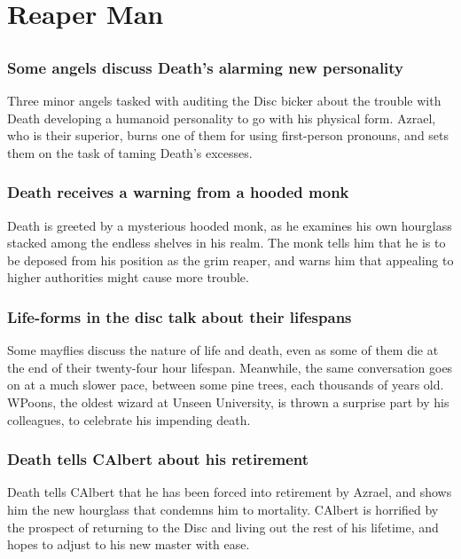 \section{Reaper Man}


\subsection{}
\subsubsection{Some angels discuss \Gls{Death}'s alarming new personality}
Three minor angels tasked with auditing the Disc bicker about the trouble with \Gls{Death}
developing a humanoid personality to go with his physical form. \Gls{Azrael}, who is their superior,
burns one of them for using first-person pronouns, and sets them on the task of taming \Gls{Death}'s
excesses.

\subsubsection{\Gls{Death} receives a warning from a hooded monk}
\Gls{Death} is greeted by a mysterious hooded monk, as he examines his own hourglass stacked among
the endless shelves in his realm. The monk tells him that he is to be deposed from his position as
the grim reaper, and warns him that appealing to higher authorities might cause more trouble.

\subsubsection{Life-forms in the disc talk about their lifespans}
Some mayflies discuss the nature of life and death, even as some of them die at the end of their
twenty-four hour lifespan. Meanwhile, the same conversation goes on at a much slower pace, between
some pine trees, each thousands of years old. \Gls{WPoons}, the oldest wizard at Unseen University,
is thrown a surprise part by his colleagues, to celebrate his impending death.

\subsubsection{\Gls{Death} tells \Gls{CAlbert} about his retirement}
\Gls{Death} tells \Gls{CAlbert} that he has been forced into retirement by \Gls{Azrael}, and shows
him the new hourglass that condemns him to mortality. \Gls{CAlbert} is horrified by the prospect of
returning to the Disc and living out the rest of his lifetime, and hopes to adjust to his new
master with ease.

